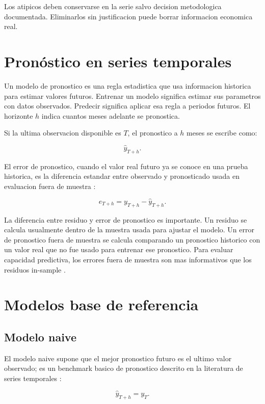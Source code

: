 ﻿\documentclass[12pt,letterpaper]{article}
\newcommand{\yhat}{\hat{y}}
\begin{document}
Los atipicos deben conservarse en la serie salvo decision metodologica documentada. Eliminarlos sin justificacion puede borrar informacion economica real.



\section{Pronóstico en series temporales}

Un modelo de pronostico es una regla estadistica que usa informacion historica para estimar valores futuros. Entrenar un modelo significa estimar sus parametros con datos observados. Predecir significa aplicar esa regla a periodos futuros. El horizonte \(h\) indica cuantos meses adelante se pronostica.

Si la ultima observacion disponible es \(T\), el pronostico a \(h\) meses se escribe como:

\[
\yhat_{T+h}.
\]

El error de pronostico, cuando el valor real futuro ya se conoce en una prueba historica, es la diferencia estandar entre observado y pronosticado usada en evaluacion fuera de muestra \citep{tashman2000,hyndman_koehler2006}:

\[
e_{T+h}=y_{T+h}-\yhat_{T+h}.
\]

La diferencia entre residuo y error de pronostico es importante. Un residuo se calcula usualmente dentro de la muestra usada para ajustar el modelo. Un error de pronostico fuera de muestra se calcula comparando un pronostico historico con un valor real que no fue usado para entrenar ese pronostico. Para evaluar capacidad predictiva, los errores fuera de muestra son mas informativos que los residuos in-sample \citep{tashman2000}.

\section{Modelos base de referencia}

\subsection{Modelo naive}

El modelo naive supone que el mejor pronostico futuro es el ultimo valor observado; es un benchmark basico de pronostico descrito en la literatura de series temporales \citep{hyndman2021fpp3}:

\[
\yhat_{T+h}=y_T.
\]
\end{document}
